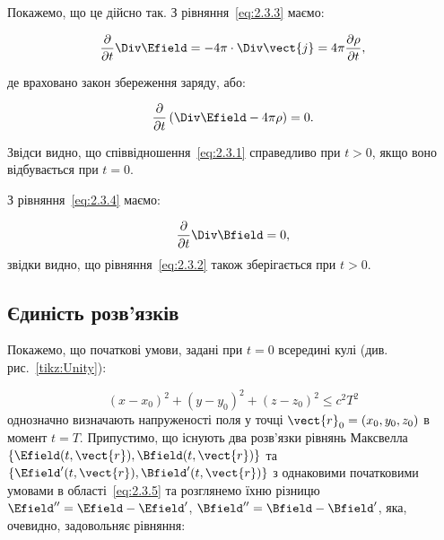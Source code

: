 Покажемо, що це дійсно так. З рівняння~\eqref{eq:2.3.3} маємо:

\begin{equation*}
	\frac{\partial}{\partial t} \Div \Efield = -4\pi \cdot \Div \vect{j} = 4\pi \frac{\partial \rho}{\partial t},
\end{equation*}

де враховано закон збереження заряду, або:

\begin{equation*}
	\frac{\partial}{\partial t} \left(\Div \Efield - 4\pi\rho \right) = 0.
\end{equation*}

Звідси видно, що співвідношення~\eqref{eq:2.3.1} справедливо при \( t > 0 \), якщо воно відбувається при \( t = 0 \).

З рівняння~\eqref{eq:2.3.4} маємо:

\begin{equation*}
	\frac{\partial}{\partial t} \Div \Bfield = 0,
\end{equation*}
звідки видно, що рівняння~\eqref{eq:2.3.2} також зберігається при \( t > 0 \).


\subsection*{Єдиність розв'язків}


Покажемо, що початкові умови, задані при \( t = 0 \) всередині кулі (див. рис.~\ref{tikz:Unity}):

\begin{equation}
	(x - x_0)^2 + (y - y_0)^2 + (z - z_0)^2 \leqslant c^2 T^2 \label{eq:2.3.5}
\end{equation}
однозначно визначають напруженості поля у точці \( \vect{r}_0 = (x_0, y_0, z_0) \) в момент \( t = T \). Припустимо, що
існують два розв'язки рівнянь Максвелла \( \{\Efield(t, \vect{r}), \Bfield(t, \vect{r})\} \) та \( \{\Efield'(t,
\vect{r}), \Bfield'(t, \vect{r})\} \) з однаковими початковими умовами в області~\eqref{eq:2.3.5} та розглянемо їхню
різницю \( \Efield'' = \Efield - \Efield' \), \( \Bfield'' = \Bfield - \Bfield' \), яка, очевидно, задовольняє
рівняння:


